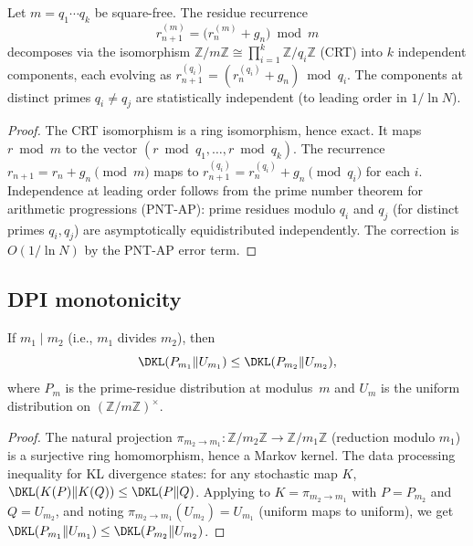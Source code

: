 \documentclass[12pt,a4paper]{article}
\begin{document}
\mTHM
\begin{theorem}
\label{thm:gauge}
Let $m = q_1 \cdots q_k$ be square-free. The residue recurrence
\[
  r_{n+1}^{(m)} = \bigl(r_n^{(m)} + g_n\bigr) \bmod m
\]
decomposes via the isomorphism $\mathbb{Z}/m\mathbb{Z} \cong
\prod_{i=1}^k \mathbb{Z}/q_i\mathbb{Z}$ (CRT) into $k$ independent
components, each evolving as $r_{n+1}^{(q_i)} = (r_n^{(q_i)} + g_n)
\bmod q_i$. The components at distinct primes $q_i \neq q_j$ are
statistically independent (to leading order in $1/\ln N$).
\end{theorem}

\begin{proof}
The CRT isomorphism is a ring isomorphism, hence exact. It maps
$r \bmod m$ to the vector $(r \bmod q_1, \ldots, r \bmod q_k)$.
The recurrence $r_{n+1} = r_n + g_n \pmod m$ maps to
$r_{n+1}^{(q_i)} = r_n^{(q_i)} + g_n \pmod{q_i}$ for each $i$.
Independence at leading order follows from the prime number theorem
for arithmetic progressions (PNT-AP): prime residues modulo $q_i$ and
$q_j$ (for distinct primes $q_i, q_j$) are asymptotically equidistributed
independently. The correction is $O(1/\ln N)$ by the PNT-AP error term.
\end{proof}

\subsection{DPI monotonicity}
\label{sec:dpi}

\mID
\begin{idbox}
\label{id:dpi}
If $m_1 \mid m_2$ (i.e., $m_1$ divides $m_2$), then
\begin{equation}
  \DKL(P_{m_1} \| U_{m_1}) \leq \DKL(P_{m_2} \| U_{m_2}),
  \label{eq:dpi}
\end{equation}
where $P_m$ is the prime-residue distribution at modulus~$m$ and
$U_m$ is the uniform distribution on $(\mathbb{Z}/m\mathbb{Z})^\times$.

\begin{proof}
The natural projection $\pi_{m_2 \to m_1} : \mathbb{Z}/m_2\mathbb{Z}
\to \mathbb{Z}/m_1\mathbb{Z}$ (reduction modulo $m_1$) is a surjective
ring homomorphism, hence a Markov kernel. The data processing inequality
for KL divergence states: for any stochastic map $K$,
$\DKL(K(P) \| K(Q)) \leq \DKL(P \| Q)$. Applying to $K = \pi_{m_2 \to m_1}$
with $P = P_{m_2}$ and $Q = U_{m_2}$, and noting $\pi_{m_2 \to m_1}(U_{m_2})
= U_{m_1}$ (uniform maps to uniform), we get $\DKL(P_{m_1} \| U_{m_1})
\leq \DKL(P_{m_2} \| U_{m_2})$.
\end{proof}
\end{idbox}
\end{document}
